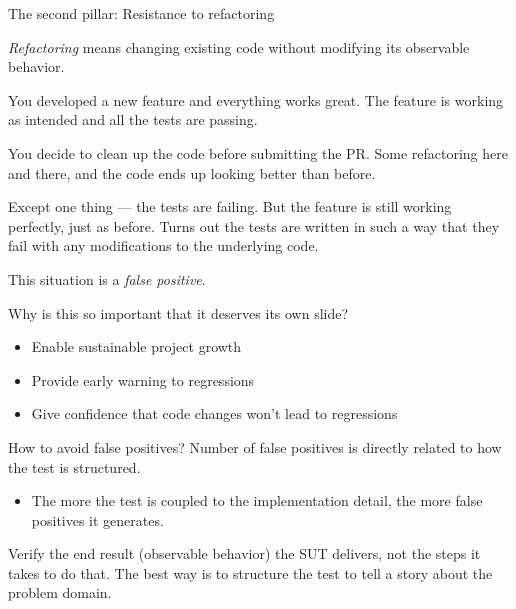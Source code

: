 \documentclass[english,handout,10pt,aspectratio=169,t]{beamer}
\begin{document}
\begin{frame}{The second pillar: Resistance to refactoring}
  \begin{minipage}{\linewidth}
    \textit{Refactoring} means changing existing code without modifying its
    observable behavior.
  \end{minipage}
  \vfill
  \begin{minipage}{\linewidth}
     You developed a new feature and everything works great. The
    feature is working as intended and all the tests are passing.

    \medskip
    
    You decide to clean up the code before submitting the PR. Some refactoring here
    and there, and the code ends up looking better than before.

    \medskip
    
    Except one thing --- the tests are failing. But the feature is still working
    perfectly, just as before. Turns out the tests are written in such a way that
    they fail with any modifications to the underlying code.

    \medskip

    This situation is a \textit{false positive}.
  \end{minipage}
  \vfill
  \begin{minipage}{\linewidth}
    Why is this so important that it deserves its own slide?

    \begin{itemize}
      \item Enable sustainable project growth
      \item Provide early warning to regressions
      \item Give confidence that code changes won't lead to regressions
    \end{itemize}
  \end{minipage}
\end{frame}

\begin{frame}{How to avoid false positives?}
  Number of false positives is directly related to how the test is structured.
  \begin{itemize}
    \item The more the test is coupled to the implementation detail, the more false
    positives it generates.
  \end{itemize}

   Verify the end result (observable behavior) the SUT delivers,
  not the steps it takes to do that. The best way is to structure the test to tell
  a story about the problem domain.
\end{frame}
\end{document}
